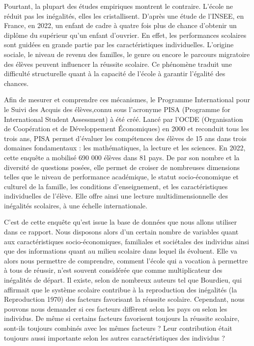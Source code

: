 \documentclass[
  french,
  11pt,
  a4paper,
]{report}
\begin{document}
Pourtant, la plupart des études empiriques montrent le contraire.
L'école ne réduit pas les inégalités, elles les cristallisent. D'après
une étude de l'INSEE, en France, en 2022, un enfant de cadre à quatre
fois plus de chance d'obtenir un diplôme du supérieur qu'un enfant
d'ouvrier. En effet, les performances scolaires sont guidées en grande
partie par les caractéristiques individuelles. L'origine sociale, le
niveau de revenu des familles, le genre ou encore le parcours migratoire
des élèves peuvent influencer la réussite scolaire. Ce phénomène traduit
une difficulté structurelle quant à la capacité de l'école à garantir
l'égalité des chances.

Afin de mesurer et comprendre ces mécanismes, le Programme International
pour le Suivi des Acquis des élèves,connu sous l'acronyme PISA
(Programme for International Student Assessment) à été créé. Lancé par
l'OCDE (Organisation de Coopération et de Développement Économiques) en
2000 et reconduit tous les trois ans, PISA permet d'évaluer les
compétences des élèves de 15 ans dans trois domaines fondamentaux : les
mathématiques, la lecture et les sciences. En 2022, cette enquête a
mobilisé 690 000 élèves dans 81 pays. De par son nombre et la diversité
de questions posées, elle permet de croiser de nombreuses dimensions
telles que le niveau de performance académique, le statut
socio-économique et culturel de la famille, les conditions
d'enseignement, et les caractéristiques individuelles de l'élève. Elle
offre ainsi une lecture multidimensionnelle des inégalités scolaires, à
une échelle internationale.

C'est de cette enquête qu'est issue la base de données que nous allons
utiliser dans ce rapport. Nous disposons alors d'un certain nombre de
variables quant aux caractéristiques socio-économiques, familiales et
sociétales des individus ainsi que des informations quant au milieu
scolaire dans lequel ils évoluent. Elle va alors nous permettre de
comprendre, comment l'école qui a vocation à permettre à tous de
réussir, n'est souvent considérée que comme multiplicateur des
inégalités de départ. Il existe, selon de nombreux auteurs tel que
Bourdieu, qui affirmait que le système scolaire contribue à la
reproduction des inégalités (la Reproduction 1970) des facteurs
favorisant la réussite scolaire. Cependant, nous pouvons nous demander
si ces facteurs diffèrent selon les pays ou selon les individus. De même
si certains facteurs favorisent toujours la réussite scolaire, sont-ils
toujours combinés avec les mêmes facteurs ? Leur contribution était
toujours aussi importante selon les autres caractéristiques des
individus ?
\end{document}
